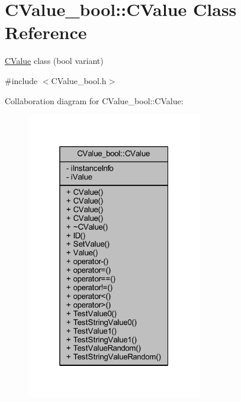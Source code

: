 \hypertarget{class_c_value__bool_1_1_c_value}{}\section{C\+Value\+\_\+bool\+:\+:C\+Value Class Reference}
\label{class_c_value__bool_1_1_c_value}


\hyperlink{class_c_value__bool_1_1_c_value}{C\+Value} class ({\ttfamily bool} variant)  




{\ttfamily \#include $<$C\+Value\+\_\+bool.\+h$>$}



Collaboration diagram for C\+Value\+\_\+bool\+:\+:C\+Value\+:
\nopagebreak
\begin{figure}[H]
\begin{center}
\leavevmode
\includegraphics[width=217pt]{class_c_value__bool_1_1_c_value__coll__graph}
\end{center}
\end{figure}
